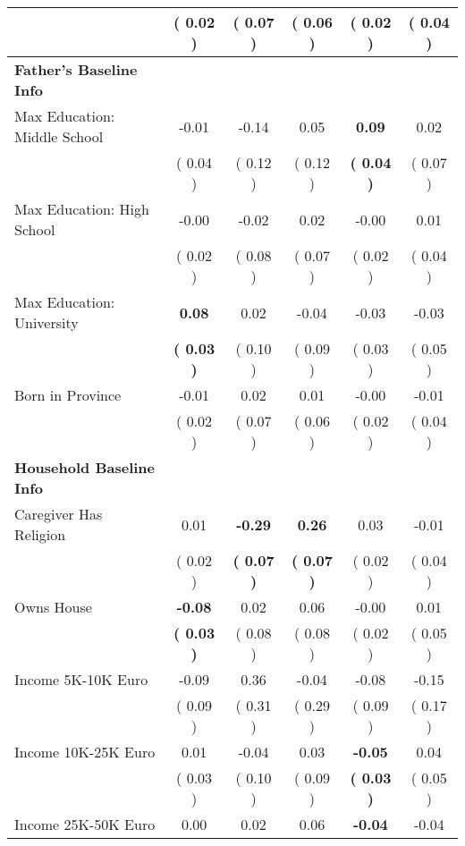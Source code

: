 \begin{table}[H]
{\begin{tabular}{lccccc}
\quad  & (     0.02 ) & (     0.07 )  & (     0.06 )  & (     0.02 ) & (     0.04 ) \\
\midrule
\textbf{Father's Baseline Info} \\
\quad Max Education: Middle School &     -0.01 &     -0.14 &      0.05 & \textbf{     0.09} &      0.02 \\
\quad  & (     0.04 ) & (     0.12 )  & (     0.12 )  & \textbf{(     0.04 )} & (     0.07 ) \\
\quad Max Education: High School &     -0.00 &     -0.02 &      0.02 &     -0.00 &      0.01 \\
\quad  & (     0.02 ) & (     0.08 )  & (     0.07 )  & (     0.02 ) & (     0.04 ) \\
\quad Max Education: University & \textbf{     0.08} &      0.02 &     -0.04 &     -0.03 &     -0.03 \\
\quad  & \textbf{(     0.03 )} & (     0.10 )  & (     0.09 )  & (     0.03 ) & (     0.05 ) \\
\quad Born in Province &     -0.01 &      0.02 &      0.01 &     -0.00 &     -0.01 \\
\quad  & (     0.02 ) & (     0.07 )  & (     0.06 )  & (     0.02 ) & (     0.04 ) \\
\midrule
\textbf{Household Baseline Info} \\
\quad Caregiver Has Religion &      0.01 & \textbf{    -0.29} & \textbf{     0.26} &      0.03 &     -0.01 \\
\quad  & (     0.02 ) & \textbf{(     0.07 )}  & \textbf{(     0.07 )}  & (     0.02 ) & (     0.04 ) \\
\quad Owns House & \textbf{    -0.08} &      0.02 &      0.06 &     -0.00 &      0.01 \\
\quad  & \textbf{(     0.03 )} & (     0.08 )  & (     0.08 )  & (     0.02 ) & (     0.05 ) \\
\quad Income 5K-10K Euro &     -0.09 &      0.36 &     -0.04 &     -0.08 &     -0.15 \\
\quad  & (     0.09 ) & (     0.31 )  & (     0.29 )  & (     0.09 ) & (     0.17 ) \\
\quad Income 10K-25K Euro &      0.01 &     -0.04 &      0.03 & \textbf{    -0.05} &      0.04 \\
\quad  & (     0.03 ) & (     0.10 )  & (     0.09 )  & \textbf{(     0.03 )} & (     0.05 ) \\
\quad Income 25K-50K Euro &      0.00 &      0.02 &      0.06 & \textbf{    -0.04} &     -0.04 \\

\end{tabular}}
\end{table}
